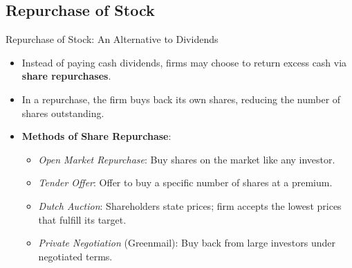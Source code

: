 \subsection{Repurchase of Stock}
\begin{frame}{Repurchase of Stock: An Alternative to Dividends}

\begin{itemize}
    \item Instead of paying cash dividends, firms may choose to return excess cash via \textbf{share repurchases}.
    \item In a repurchase, the firm buys back its own shares, reducing the number of shares outstanding.
    
    \vspace{2mm}
    \item \textbf{Methods of Share Repurchase}:
    \begin{itemize}
        \item \textit{Open Market Repurchase}: Buy shares on the market like any investor.
        \item \textit{Tender Offer}: Offer to buy a specific number of shares at a premium.
        \item \textit{Dutch Auction}: Shareholders state prices; firm accepts the lowest prices that fulfill its target.
        \item \textit{Private Negotiation} (Greenmail): Buy back from large investors under negotiated terms.
    \end{itemize}
\end{itemize}

\end{frame}

